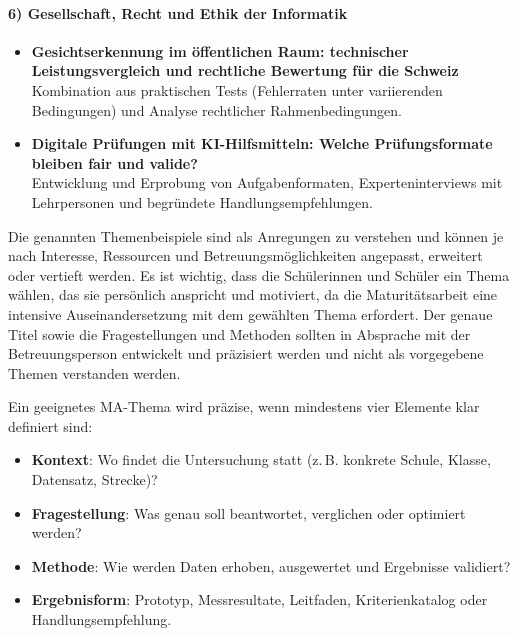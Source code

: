 \paragraph{6) Gesellschaft, Recht und Ethik der Informatik}
\begin{itemize}
    \item \textbf{Gesichtserkennung im öffentlichen Raum: technischer Leistungsvergleich und rechtliche Bewertung für die Schweiz}\\
    Kombination aus praktischen Tests (Fehlerraten unter variierenden Bedingungen) und Analyse rechtlicher Rahmenbedingungen.
    \item[\faStar] \textbf{Digitale Prüfungen mit KI-Hilfsmitteln: Welche Prüfungsformate bleiben fair und valide?}\\
    Entwicklung und Erprobung von Aufgabenformaten, Experteninterviews mit Lehrpersonen und begründete Handlungsempfehlungen.
\end{itemize}

\begin{myattention}
Die genannten Themenbeispiele sind als Anregungen zu verstehen und können je nach Interesse, Ressourcen und Betreuungsmöglichkeiten angepasst, erweitert oder vertieft werden. Es ist wichtig, dass die Schülerinnen und Schüler ein Thema wählen, das sie persönlich anspricht und motiviert, da die Maturitätsarbeit eine intensive Auseinandersetzung mit dem gewählten Thema erfordert. Der genaue Titel sowie die Fragestellungen und Methoden sollten in Absprache mit der Betreuungsperson entwickelt und präzisiert werden und nicht als vorgegebene Themen verstanden werden.
\end{myattention}


\begin{myattention}
Ein geeignetes MA-Thema wird präzise, wenn mindestens vier Elemente klar definiert sind:
\begin{itemize}
    \item \textbf{Kontext}: Wo findet die Untersuchung statt (z.\,B. konkrete Schule, Klasse, Datensatz, Strecke)?
    \item \textbf{Fragestellung}: Was genau soll beantwortet, verglichen oder optimiert werden?
    \item \textbf{Methode}: Wie werden Daten erhoben, ausgewertet und Ergebnisse validiert?
    \item \textbf{Ergebnisform}: Prototyp, Messresultate, Leitfaden, Kriterienkatalog oder Handlungsempfehlung.
\end{itemize}
\end{myattention}


